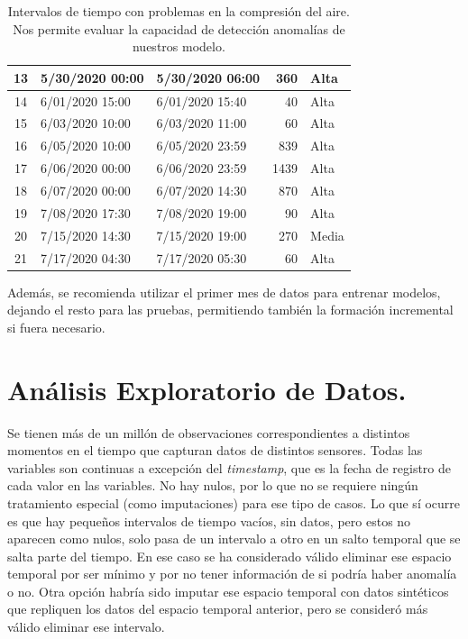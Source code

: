 \documentclass[12pt,letterpaper]{article}
\begin{document}
\begin{table}[htp]
\begin{tabular}{|c|l|l|r|l|}
13           & 5/30/2020 00:00          & 5/30/2020 06:00           & 360                & Alta              \\ \hline
14           & 6/01/2020 15:00          & 6/01/2020 15:40           & 40                 & Alta              \\ \hline
15           & 6/03/2020 10:00          & 6/03/2020 11:00           & 60                 & Alta              \\ \hline
16           & 6/05/2020 10:00          & 6/05/2020 23:59           & 839                & Alta              \\ \hline
17           & 6/06/2020 00:00          & 6/06/2020 23:59           & 1439               & Alta              \\ \hline
18           & 6/07/2020 00:00          & 6/07/2020 14:30           & 870                & Alta              \\ \hline
19           & 7/08/2020 17:30          & 7/08/2020 19:00           & 90                 & Alta              \\ \hline
20           & 7/15/2020 14:30          & 7/15/2020 19:00           & 270                & Media            \\ \hline
21           & 7/17/2020 04:30          & 7/17/2020 05:30           & 60                 & Alta              \\ \hline
\end{tabular}
    \caption{
    Intervalos de tiempo con problemas en la compresión del aire.
    Nos permite evaluar la capacidad de detección anomalías de nuestros modelo.}
    \label{tab:Reportes}
\end{table}

Además, se recomienda utilizar el primer mes de datos para entrenar modelos, dejando el resto para las pruebas, permitiendo también la formación incremental si fuera necesario.


\section{Análisis Exploratorio de Datos.}
Se tienen más de un millón de observaciones correspondientes a distintos momentos en el tiempo que capturan datos de distintos sensores. Todas las variables son continuas a excepción del \textit{timestamp}, que es la fecha de registro de cada valor en las variables.
No hay nulos, por lo que no se requiere ningún tratamiento especial (como imputaciones) para ese tipo de casos. Lo que sí ocurre es que hay pequeños intervalos de tiempo vacíos, sin datos, pero estos no aparecen como nulos, solo pasa de un intervalo a otro en un salto temporal que se salta parte del tiempo. En ese caso se ha considerado válido eliminar ese espacio temporal por ser mínimo y por no tener información de si podría haber anomalía o no. Otra opción habría sido imputar ese espacio temporal con datos sintéticos que repliquen los datos del espacio temporal anterior, pero se consideró más válido eliminar ese intervalo.
\end{document}
